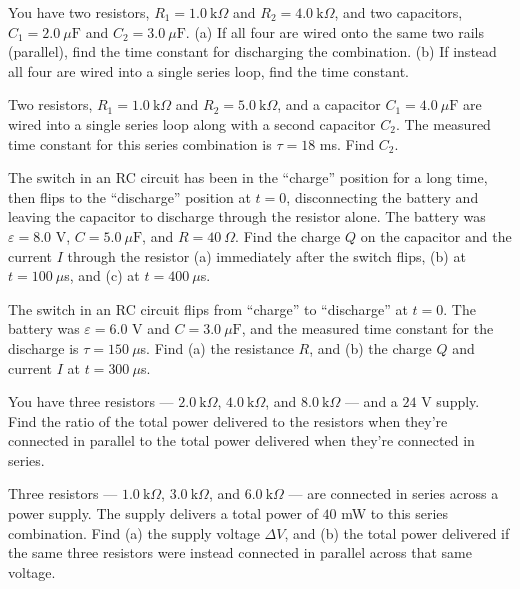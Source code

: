 \documentclass[12pt]{article}
\begin{document}
\prob You have two resistors, $R_1=1.0\ \text{k}\Omega$ and
$R_2=4.0\ \text{k}\Omega$, and two capacitors, $C_1=2.0\ \mu\text{F}$ and
$C_2=3.0\ \mu\text{F}$. (a) If all four are wired onto the same two rails
(parallel), find the time constant for discharging the combination.
(b) If instead all four are wired into a single series loop, find the
time constant.


\prob Two resistors, $R_1=1.0\ \text{k}\Omega$ and $R_2=5.0\
\text{k}\Omega$, and a capacitor $C_1=4.0\ \mu\text{F}$ are wired into a
single series loop along with a second capacitor $C_2$. The measured time
constant for this series combination is $\tau=18$ ms. Find $C_2$.


\prob The switch in an RC circuit has been in the ``charge'' position for
a long time, then flips to the ``discharge'' position at $t=0$,
disconnecting the battery and leaving the capacitor to discharge through
the resistor alone. The battery was $\varepsilon=8.0$ V, $C=5.0\
\mu\text{F}$, and $R=40\ \Omega$. Find the charge $Q$ on the capacitor and
the current $I$ through the resistor (a) immediately after the switch
flips, (b) at $t=100\ \mu$s, and (c) at $t=400\ \mu$s.


\prob The switch in an RC circuit flips from ``charge'' to ``discharge''
at $t=0$. The battery was $\varepsilon=6.0$ V and $C=3.0\ \mu\text{F}$,
and the measured time constant for the discharge is $\tau=150\ \mu$s.
Find (a) the resistance $R$, and (b) the charge $Q$ and current $I$ at
$t=300\ \mu$s.


\prob You have three resistors --- $2.0\ \text{k}\Omega$,
$4.0\ \text{k}\Omega$, and $8.0\ \text{k}\Omega$ --- and a $24$ V supply.
Find the ratio of the total power delivered to the resistors when they're
connected in parallel to the total power delivered when they're connected
in series.


\prob Three resistors --- $1.0\ \text{k}\Omega$, $3.0\ \text{k}\Omega$,
and $6.0\ \text{k}\Omega$ --- are connected in series across a power
supply. The supply delivers a total power of $40$ mW to this series
combination. Find (a) the supply voltage $\Delta V$, and (b) the total
power delivered if the same three resistors were instead connected in
parallel across that same voltage.

\end{document}
